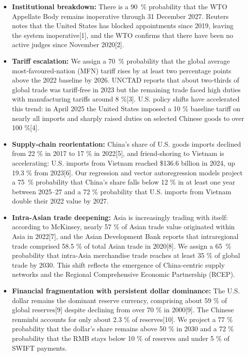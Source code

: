 \documentclass[12pt]{article}
\begin{document}
\begin{itemize}
\item \textbf{Institutional breakdown:}  There is a 90~\% probability that the WTO Appellate Body remains inoperative through 31 December 2027.  Reuters notes that the United States has blocked appointments since 2019, leaving the system inoperative[1], and the WTO confirms that there have been no active judges since November 2020[2].

\item \textbf{Tariff escalation:}  We assign a 70~\% probability that the global average most‑favoured‑nation (MFN) tariff rises by at least two percentage points above the 2022 baseline by 2026.  UNCTAD reports that about two‑thirds of global trade was tariff‑free in 2023 but the remaining trade faced high duties with manufacturing tariffs around 8 \%[3].  U.S. policy shifts have accelerated this trend: in April 2025 the United States imposed a 10 \% baseline tariff on nearly all imports and sharply raised duties on selected Chinese goods to over 100 \%[4].

\item \textbf{Supply‑chain reorientation:}  China's share of U.S. goods imports declined from 22 \% in 2017 to 17 \% in 2022[5], and friend‑shoring to Vietnam is accelerating: U.S. imports from Vietnam reached \$136.6 billion in 2024, up 19.3 \% from 2023[6].  Our regression and vector autoregression models project a 75~\% probability that China's share falls below 12 \% in at least one year between 2025–27 and a 72 \% probability that U.S. imports from Vietnam double their 2022 value by 2027.

\item \textbf{Intra‑Asian trade deepening:}  Asia is increasingly trading with itself: according to McKinsey, nearly 57 \% of Asian trade value originated within Asia in 2022[7], and the Asian Development Bank reports that intraregional trade comprised 58.5 \% of total Asian trade in 2020[8].  We assign a 65~\% probability that intra‑Asia merchandise trade reaches at least 35 \% of global trade by 2030.  This shift reflects the emergence of China‑centric supply networks and the Regional Comprehensive Economic Partnership (RCEP).

\item \textbf{Financial fragmentation with persistent dollar dominance:}  The U.S. dollar remains the dominant reserve currency, comprising about 59 \% of global reserves[9] despite declining from over 70 \% in 2000[9].  The Chinese renminbi accounts for only about 2.3 \% of reserves[10].  We project a 77 \% probability that the dollar's share remains above 50 \% in 2030 and a 72 \% probability that the RMB stays below 10 \% of reserves and under 5 \% of SWIFT payments.


\end{itemize}
\end{document}
